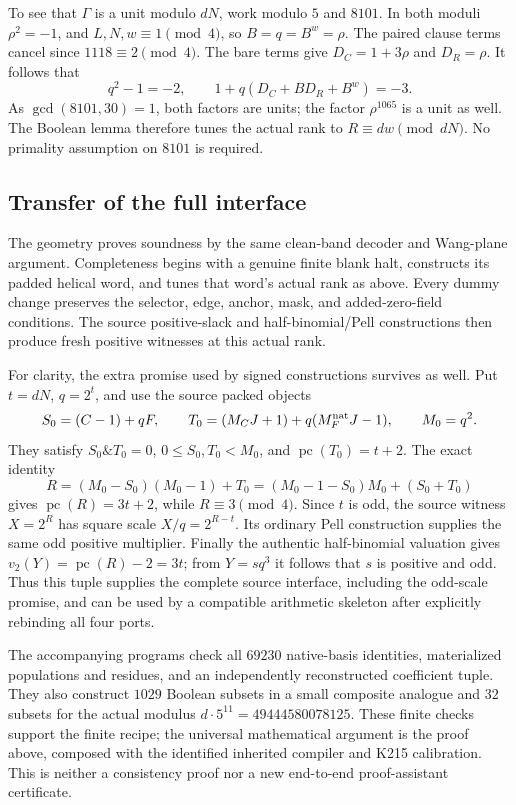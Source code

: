 To see that $\Gamma$ is a unit modulo $dN$, work modulo $5$ and $8101$.
In both moduli $\rho^2=-1$, and $L,N,w\equiv1\pmod4$, so
$B=q=B^w=\rho$.  The paired clause terms cancel since $1118\equiv2\pmod4$.
The bare terms give $D_C=1+3\rho$ and $D_R=\rho$.  It follows that
\[
 q^2-1=-2,\qquad 1+q(D_C+BD_R+B^w)=-3.
\]
As $\gcd(8101,30)=1$, both factors are units; the factor $\rho^{1065}$
is a unit as well.  The Boolean lemma therefore tunes the actual rank to
$R\equiv dw\pmod{dN}$.  No primality assumption on $8101$ is required.

\subsection{Transfer of the full interface}

The geometry proves soundness by the same clean-band decoder and Wang-plane
argument.  Completeness begins with a genuine finite blank halt, constructs
its padded helical word, and tunes that word's actual rank as above.  Every
dummy change preserves the selector, edge, anchor, mask, and added-zero-field
conditions.  The source positive-slack and half-binomial/Pell constructions
then produce fresh positive witnesses at this actual rank.

For clarity, the extra promise used by signed constructions survives as well.
Put $t=dN$, $q=2^t$, and use the source packed objects
\[
 S_0=(C-1)+qF,\qquad
 T_0=(M_CJ+1)+q(M_F^{\rm nat}J-1),\qquad M_0=q^2.
\]
They satisfy $S_0\mathbin{\&}T_0=0$, $0\le S_0,T_0<M_0$, and
$\operatorname{pc}(T_0)=t+2$.  The exact identity
\[
 R=(M_0-S_0)(M_0-1)+T_0
   =(M_0-1-S_0)M_0+(S_0+T_0)
\]
gives $\operatorname{pc}(R)=3t+2$, while $R\equiv3\pmod4$.
Since $t$ is odd, the source witness $X=2^R$ has square scale
$X/q=2^{R-t}$.  Its ordinary Pell construction supplies the same odd
positive multiplier.  Finally the authentic half-binomial valuation gives
$v_2(Y)=\operatorname{pc}(R)-2=3t$; from $Y=sq^3$ it follows that $s$
is positive and odd.  Thus this tuple supplies the complete source interface,
including the odd-scale promise, and can be used by a compatible arithmetic
skeleton after explicitly rebinding all four ports.

The accompanying programs check all $69230$ native-basis identities,
materialized populations and residues, and an independently reconstructed
coefficient tuple.  They also construct $1029$ Boolean subsets in a small
composite analogue and $32$ subsets for the actual modulus
$d\cdot5^{11}=49444580078125$.  These finite checks support the finite
recipe; the universal mathematical argument is the proof above, composed
with the identified inherited compiler and K215 calibration.  This is
neither a consistency proof nor a new end-to-end proof-assistant certificate.
